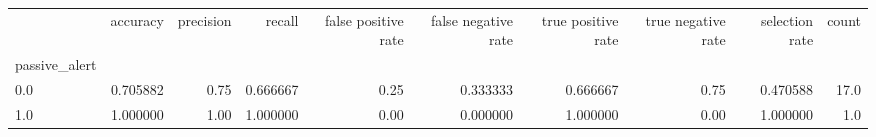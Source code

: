 \begin{tabular}{lrrrrrrrrr}
\toprule
{} &  accuracy &  precision &    recall &  false positive rate &  false negative rate &  true positive rate &  true negative rate &  selection rate &  count \\
passive\_alert &           &            &           &                      &                      &                     &                     &                 &        \\
\midrule
0.0           &  0.705882 &       0.75 &  0.666667 &                 0.25 &             0.333333 &            0.666667 &                0.75 &        0.470588 &   17.0 \\
1.0           &  1.000000 &       1.00 &  1.000000 &                 0.00 &             0.000000 &            1.000000 &                0.00 &        1.000000 &    1.0 \\
\bottomrule
\end{tabular}

